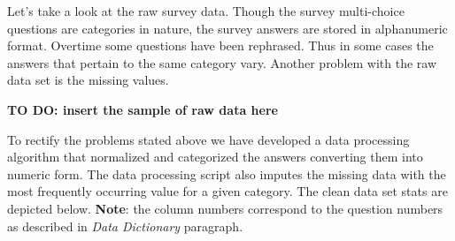 Let's take a look at the raw survey data. Though the survey multi-choice
questions are categories in nature, the survey answers are stored in
alphanumeric format. Overtime some questions have been rephrased. Thus
in some cases the answers that pertain to the same category vary.
Another problem with the raw data set is the missing values.

\textbf{TO DO: insert the sample of raw data here}

To rectify the problems stated above we have developed a data processing
algorithm that normalized and categorized the answers converting them
into numeric form. The data processing script also imputes the missing
data with the most frequently occurring value for a given category. The
clean data set stats are depicted below. \textbf{Note}: the column
numbers correspond to the question numbers as described in \emph{Data
Dictionary} paragraph.

